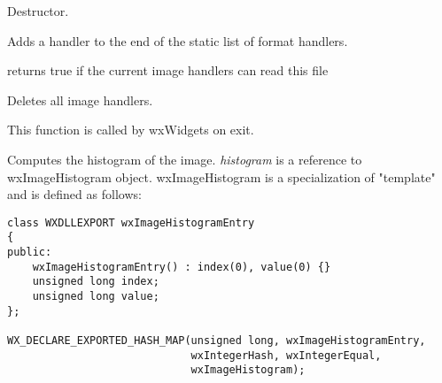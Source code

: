 \label{wximagedtor}


Destructor.


\label{wximageaddhandler}


Adds a handler to the end of the static list of format handlers.





returns true if the current image handlers can read this file


\label{wximagecleanuphandlers}


Deletes all image handlers.

This function is called by wxWidgets on exit.


\label{wximagecomputehistogram}


Computes the histogram of the image. {\it histogram} is a reference to 
wxImageHistogram object. wxImageHistogram is a specialization of 
 "template" and is defined as follows:

\begin{verbatim}
class WXDLLEXPORT wxImageHistogramEntry
{
public:
    wxImageHistogramEntry() : index(0), value(0) {}
    unsigned long index;
    unsigned long value;
};

WX_DECLARE_EXPORTED_HASH_MAP(unsigned long, wxImageHistogramEntry,
                             wxIntegerHash, wxIntegerEqual,
                             wxImageHistogram);
\end{verbatim}


